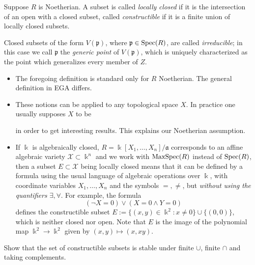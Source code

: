 \begin{definition}
	Suppose $R$ is Noetherian. A subset is called \emph{locally closed} if it is the intersection of an open with a closed subset, called \emph{constructible} if it is a finite union of locally closed subsets.

	Closed subsets of the form $V(\mathfrak{p})$, where $\mathfrak{p} \in \operatorname{Spec}(R)$, are called \emph{irreducible}; in this case we call $\mathfrak{p}$ the \emph{generic point} of $V(\mathfrak{p})$, which is uniquely characterized as the point which generalizes every member of $Z$.
\end{definition}
\begin{itemize}
	\item The foregoing definition is standard only for $R$ Noetherian. The general definition in EGA differs.
	\item These notions can be applied to any topological space $X$. In practice one usually supposes $X$ to be
		in order to get interesting results. This explains our Noetherian assumption.
	\item If $\Bbbk$ is algebraically closed, $R = \Bbbk[X_1, \ldots, X_n]/\mathfrak{a}$ corresponds to an affine algebraic variety $\mathcal{X} \subset \Bbbk^n$ and we work with $\operatorname{MaxSpec}(R)$ instead of $\operatorname{Spec}(R)$, then a subset $E \subset \mathcal{X}$ being locally closed means that it can be defined by a formula using the usual language of algebraic operations over $\Bbbk$, with coordinate variables $X_1, \ldots, X_n$  and the symbols $=, \neq$, but \emph{without using the quantifiers $\exists, \forall$}. For example, the formula
	\[ (\neg X = 0) \vee (X = 0 \wedge Y=0) \]
	defines the constructible subset $E := \{(x,y) \in \Bbbk^2 : x \neq 0 \} \cup \{(0,0) \}$, which is neither closed nor open. Note that $E$ is the image of the polynomial map $\Bbbk^2 \to \Bbbk^2$ given by $(x,y) \mapsto (x,xy)$.
\end{itemize}

\begin{exercise}
	Show that the set of constructible subsets is stable under finite $\cup$, finite $\cap$ and taking complements.
\end{exercise}


